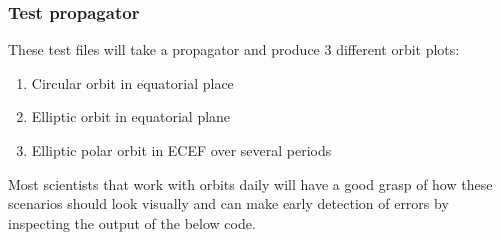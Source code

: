 \documentclass[letterpaper,10pt,english]{sphinxmanual}
\begin{document}
\subsubsection{Test propagator}
\label{\detokenize{modules/tests:test-propagator}}
These test files will take a propagator and produce 3 different orbit plots:
\begin{enumerate}
\def\theenumi{\arabic{enumi}}
\def\labelenumi{\theenumi .}
\makeatletter\def\p@enumii{\p@enumi \theenumi .}\makeatother
\item {} 
Circular orbit in equatorial place

\item {} 
Elliptic orbit in equatorial plane

\item {} 
Elliptic polar orbit in ECEF over several periods

\end{enumerate}

Most scientists that work with orbits daily will have a good grasp of how these scenarios should look visually and can make early detection of errors by inspecting the output of the below code.
\end{document}
